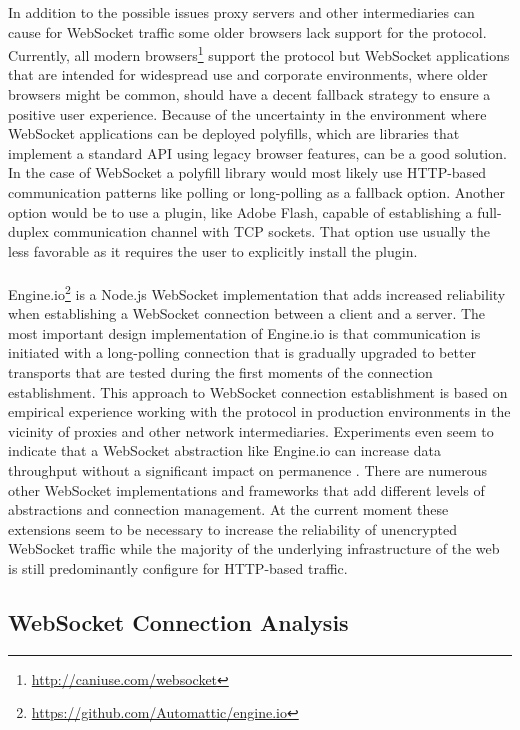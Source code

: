 In addition to the possible issues proxy servers and other intermediaries can cause for WebSocket traffic some older browsers lack support for the protocol. Currently, all modern browsers\footnote{\url{http://caniuse.com/websocket}} support the protocol but WebSocket applications that are intended for widespread use and corporate environments, where older browsers might be common, should have a decent fallback strategy to ensure a positive user experience. Because of the uncertainty in the environment where WebSocket applications can be deployed polyfills, which are libraries that implement a standard API using legacy browser features, can be a good solution. In the case of WebSocket a polyfill library would most likely use HTTP-based communication patterns like polling or long-polling as a fallback option. Another option would be to use a plugin, like Adobe Flash, capable of establishing a full-duplex communication channel with TCP sockets. That option use usually the less favorable as it requires the user to explicitly install the plugin.
\\ \\
Engine.io\footnote{\url{https://github.com/Automattic/engine.io}} is a Node.js WebSocket implementation that adds increased reliability when establishing a WebSocket connection between a client and a server. The most important design implementation of Engine.io is that communication is initiated with a long-polling connection that is gradually upgraded to better transports that are tested during the first moments of the connection establishment. This approach to WebSocket connection establishment is based on empirical experience working with the protocol in production environments in the vicinity of proxies and other network intermediaries. Experiments even seem to indicate that a WebSocket abstraction like Engine.io can increase data throughput without a significant impact on permanence \cite{ozger2014websocket}. There are numerous other WebSocket implementations and frameworks that add different levels of abstractions and connection management. At the current moment these extensions seem to be necessary to increase the reliability of unencrypted WebSocket traffic while the majority of the underlying infrastructure of the web is still predominantly configure for HTTP-based traffic.

\subsection{WebSocket Connection Analysis}

